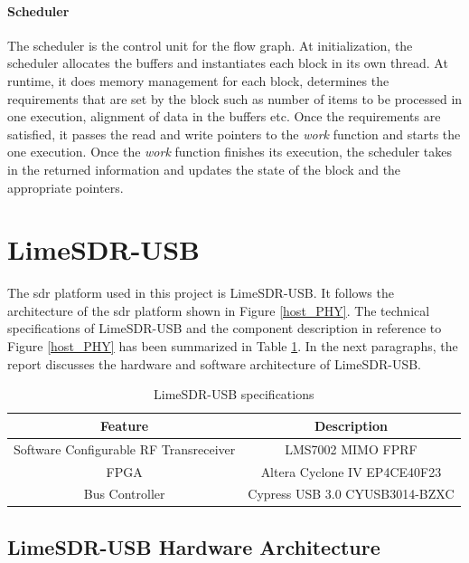\paragraph{Scheduler}
The scheduler is the control unit for the flow graph.
At initialization, the scheduler allocates the buffers and instantiates each block in its own thread.
At runtime, it does memory management for each block, determines the requirements that are set by the block such as number of items to be processed in one execution, alignment of data in the buffers etc.
Once the requirements are satisfied, it passes the read and write pointers to the \textit{work} function and starts the one execution.
Once the \textit{work} function finishes its execution, the scheduler takes in the returned information and updates the state of the block and the appropriate pointers.\\


\section{LimeSDR-USB}
The \ac{sdr} platform used in this project is LimeSDR-USB.
It follows the architecture of the \ac{sdr} platform shown in Figure \ref{host_PHY}.
The technical specifications of LimeSDR-USB and the component description in reference to Figure \ref{host_PHY} has been summarized in Table \ref{specs}.
In the next paragraphs, the report discusses the hardware and software architecture of LimeSDR-USB.


\begin{table}[h!]
\centering
\begin{tabular}{|c|c|}
\hline
Feature & Description\\
\hline
Software Configurable RF Transreceiver & LMS7002 MIMO \ac{FPRF}\\
\ac{FPGA} & Altera Cyclone IV EP4CE40F23 \\
Bus Controller & Cypress USB 3.0 CYUSB3014-BZXC\\

\hline
\end{tabular}
\caption{LimeSDR-USB specifications}
\label{specs}
\end{table}

\subsection{LimeSDR-USB Hardware Architecture}

